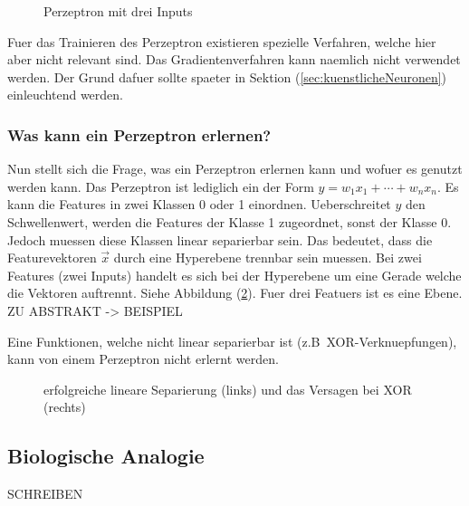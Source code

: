 \begin{figure}[h!]
  \centering
  \caption{Perzeptron mit drei Inputs}
  \label{fi:perzeptron}
\end{figure}

Fuer das Trainieren des Perzeptron existieren spezielle Verfahren, welche hier
aber nicht relevant sind. Das Gradientenverfahren kann naemlich nicht verwendet
werden. Der Grund dafuer sollte spaeter in Sektion (\ref{sec:kuenstlicheNeuronen}) einleuchtend werden.

\subsubsection{Was kann ein Perzeptron erlernen?}
Nun stellt sich die Frage, was ein Perzeptron erlernen kann und wofuer es genutzt werden kann.
Das Perzeptron ist lediglich ein  der Form
$y = w_1x_1 + \cdots + w_n x_n$.
Es kann die Features in zwei Klassen 0 oder 1 einordnen.
Ueberschreitet $y$ den Schwellenwert, werden die Features der Klasse 1 zugeordnet, sonst
der Klasse 0.
Jedoch muessen diese Klassen linear separierbar sein.
Das bedeutet, dass die Featurevektoren $\vec{x}$ durch eine Hyperebene trennbar
sein muessen.
Bei zwei Features (zwei Inputs) handelt es sich bei der Hyperebene um eine
Gerade welche die Vektoren auftrennt. Siehe Abbildung (\ref{fig:linearer_Klassifikator}).
Fuer drei Featuers ist es eine Ebene.
ZU ABSTRAKT -> BEISPIEL

Eine Funktionen, welche nicht linear separierbar ist (z.B\ XOR-Verknuepfungen),
kann von einem Perzeptron nicht erlernt werden.

\begin{figure}[h!]

  \caption{erfolgreiche lineare Separierung (links) und das Versagen bei XOR (rechts)}
  \label{fig:linearer_Klassifikator}
\end{figure}

\cite{wiki:perzeptron}

\subsection{Biologische Analogie}
SCHREIBEN

